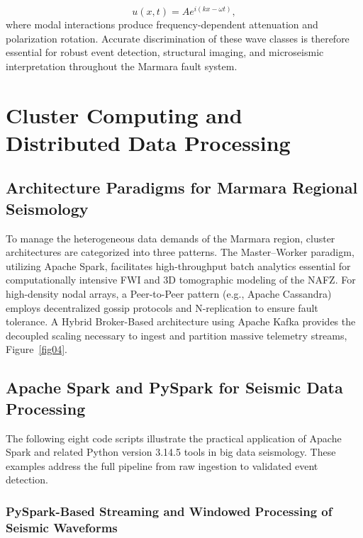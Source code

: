 \documentclass[data,article,accept,pdftex,moreauthors]{Definitions/mdpi}
\begin{document}
\begin{equation}
\label{eq:wave_displacement_field}
u(x,t) = A e^{i(kx-\omega t)},
\end{equation}
where modal interactions produce frequency-dependent attenuation and polarization rotation. Accurate discrimination of these wave classes is therefore essential for robust event detection, structural imaging, and microseismic interpretation throughout the Marmara \linebreak fault system.

\section{Cluster Computing and Distributed Data Processing}

\subsection{Architecture Paradigms for Marmara Regional Seismology}

To manage the heterogeneous data demands of the Marmara region, cluster architectures are categorized into three patterns. The Master--Worker paradigm, utilizing Apache Spark, facilitates high-throughput batch analytics essential for computationally intensive FWI and 3D tomographic modeling of the NAFZ. For high-density nodal arrays, a Peer-to-Peer pattern (e.g., Apache Cassandra) employs decentralized gossip protocols and N-replication to ensure fault tolerance. A Hybrid Broker-Based architecture using Apache Kafka provides the decoupled scaling necessary to ingest and partition massive telemetry streams, Figure~\ref{fig04}.

\subsection{Apache Spark and PySpark for Seismic Data Processing}

The following eight code scripts illustrate the practical application of Apache Spark and related Python version 3.14.5 %
 tools in big data seismology. These examples address the full pipeline from raw ingestion to validated event detection.

\subsubsection{PySpark-Based Streaming and Windowed Processing of Seismic Waveforms}
\end{document}
